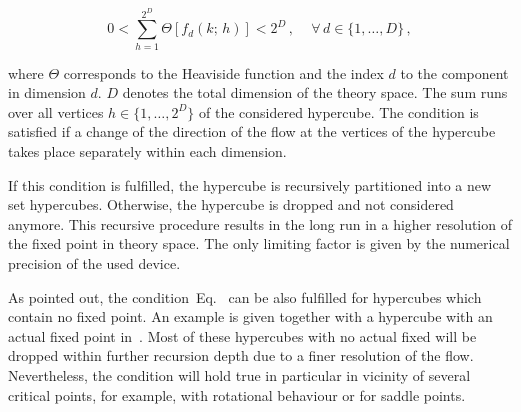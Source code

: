 \documentclass[paper=a4,11pt,bibliography=totoc]{scrartcl}
\def\eq#1{\textcolor{red!50!black}{Eq.}~\labelcref{#1}}
\begin{document}
\begin{equation}
\label{eq:fixedpointdetection}
0 < \sum_{h=1}^{2^D} \Theta\left[f_d(k;\,h)\right] < 2^D\,,\quad\,\forall\, d\in\lbrace1,\ldots,D\rbrace\,,
\end{equation}

where $\Theta$ corresponds to the Heaviside function and the index $d$ to the component in dimension $d$. $D$ denotes the total dimension of the theory space. The sum runs over all vertices $h\in\lbrace 1, \ldots, 2^D\rbrace$ of the considered hypercube. The condition is satisfied if a change of the direction of the flow at the vertices of the hypercube takes place separately within each dimension.

If this condition is fulfilled, the hypercube is recursively partitioned into a new set hypercubes. Otherwise, the hypercube is dropped and not considered anymore. This recursive procedure results in the long run in a higher resolution of the fixed point in theory space. The only limiting factor is given by the numerical precision of the used device.

As pointed out, the condition~\eq{eq:fixedpointdetection} can be also fulfilled for hypercubes which contain no fixed point. An example is given together with a hypercube with an actual fixed point in~. Most of these hypercubes with no actual fixed will be dropped within further recursion depth due to a finer resolution of the flow. Nevertheless, the condition will hold true in particular in vicinity of several critical points, for example, with rotational behaviour or for saddle points.
\end{document}
